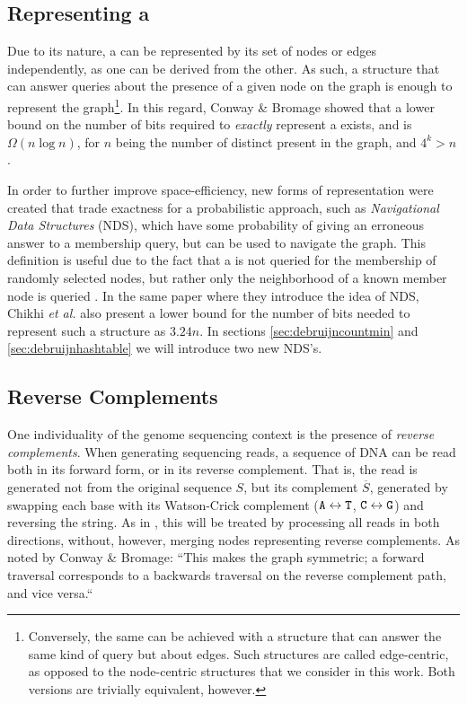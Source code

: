 \subsection{Representing a \dBG}


Due to its nature, a \dBG can be represented by its set of nodes or edges independently, as one can be derived from the other.
As such, a structure that can answer queries about the presence of a given node on the graph is enough to
represent the graph\footnote{Conversely, the same can be achieved with a structure that can answer the same kind of query but about
edges. Such structures are called edge-centric, as opposed to the node-centric structures that we consider in this work. Both versions
are trivially equivalent, however.}. In this regard, Conway \& Bromage showed that a lower bound on the number of bits required to
\emph{exactly} represent a \dBG exists, and is $\Omega(n \log n)$, for $n$ being the number of distinct \kmers present in the graph,
and $4^k > n$ \cite{Conway2011}.

In order to further improve space-efficiency, new forms of representation were created that trade exactness for a probabilistic approach,
such as \emph{Navigational Data Structures} (NDS), which have some probability of giving an erroneous answer to a membership query, 
but can be used to navigate the graph. This definition is useful due to the fact that a \dBG is not queried for the membership of randomly
selected nodes, but rather only the neighborhood of a known member node is queried \cite{Chikhi2014}. In the same paper where they introduce
the idea of NDS, Chikhi \emph{et al.} also present a lower bound for the number of bits needed to represent such a structure as $3.24n$.
In sections \ref{sec:debruijncountmin} and \ref{sec:debruijnhashtable} we will introduce two new NDS's. 

\subsection{Reverse Complements}

One individuality of the genome sequencing context is the presence of \emph{reverse complements}. When generating sequencing reads,
a sequence of DNA can be read both in its forward form, or in its reverse complement. That is, the read is generated not from the
original sequence $S$, but its complement $\overline{S}$, generated by swapping each base with its Watson-Crick complement
($\mathtt{A} \leftrightarrow \mathtt{T}$, $\mathtt{C} \leftrightarrow \mathtt{G}$) and reversing the string. As in \cite{Conway2011}, this will be treated by processing
all reads in both directions, without, however, merging nodes representing reverse complements. As noted by Conway \& Bromage: ``This
makes the graph symmetric; a forward traversal corresponds to a backwards traversal on the reverse complement path, and vice versa.``
\cite{Conway2011}


